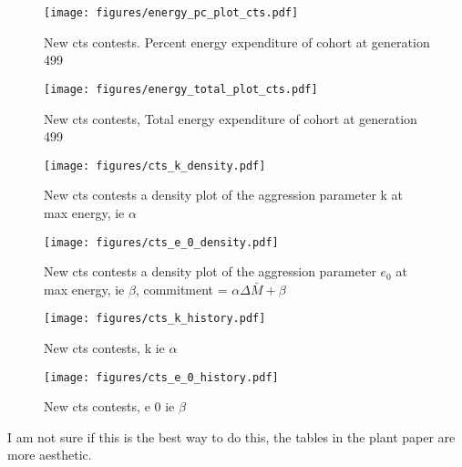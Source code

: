 \documentclass[a4paper,11pt]{article}
\begin{document}
\begin{figure}[h!]
    \centering
    \texttt{[image: figures/energy\_pc\_plot\_cts.pdf]}
    \caption{New cts contests. Percent energy expenditure of cohort at generation 499}
    \label{fig:var energy pc}
    \centering
    \texttt{[image: figures/energy\_total\_plot\_cts.pdf]}
    \caption{New cts contests, Total energy expenditure of cohort at generation 499}
    \label{fig:var energy total}
\end{figure}


\begin{figure}[h!]
    \centering
    \texttt{[image: figures/cts\_k\_density.pdf]}
    \caption{New cts contests a density plot of the aggression parameter k at max energy, ie $\alpha$}
    \label{fig:var k density}

    \texttt{[image: figures/cts\_e\_0\_density.pdf]}
    \caption{ New cts contests a density plot of the aggression parameter $e_0$ at max energy, ie $\beta$,
    commitment = $\alpha \Delta \bar{M} + \beta$ }
    \label{fig:var e_0 density}
\end{figure}

\begin{figure}[h!]
    \centering
    \texttt{[image: figures/cts\_k\_history.pdf]}
    \caption{New cts contests, k ie $\alpha$}
    \label{fig:k history}

    \texttt{[image: figures/cts\_e\_0\_history.pdf]}
    \caption{New cts contests,  e 0 ie $\beta$}
    \label{fig:e_0 history}
\end{figure}


\clearpage


I am not sure if this is the best way to do this, the tables in the plant paper are more aesthetic.\\
\end{document}
